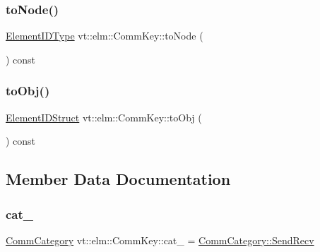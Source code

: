 \subsubsection{\texorpdfstring{to\+Node()}{toNode()}}
{\footnotesize\ttfamily \hyperlink{namespacevt_1_1elm_a63afb64985b41b7b6dcf2f01336391f8}{Element\+I\+D\+Type} vt\+::elm\+::\+Comm\+Key\+::to\+Node (\begin{DoxyParamCaption}{ }\end{DoxyParamCaption}) const\hspace{0.3cm}{\ttfamily [inline]}}

\mbox{\label{structvt_1_1elm_1_1_comm_key_a4dd567c04eea5bb8aeb2acd7ad8f01de}} 
\subsubsection{\texorpdfstring{to\+Obj()}{toObj()}}
{\footnotesize\ttfamily \hyperlink{structvt_1_1elm_1_1_element_i_d_struct}{Element\+I\+D\+Struct} vt\+::elm\+::\+Comm\+Key\+::to\+Obj (\begin{DoxyParamCaption}{ }\end{DoxyParamCaption}) const\hspace{0.3cm}{\ttfamily [inline]}}



\subsection{Member Data Documentation}
\mbox{\label{structvt_1_1elm_1_1_comm_key_a96646f0648cd255cf4cdc37bcc3597ac}} 
\subsubsection{\texorpdfstring{cat\+\_\+}{cat\_}}
{\footnotesize\ttfamily \hyperlink{namespacevt_1_1elm_ab7367fdbe88bdcf329563642147f9ae2}{Comm\+Category} vt\+::elm\+::\+Comm\+Key\+::cat\+\_\+ = \hyperlink{namespacevt_1_1elm_ab7367fdbe88bdcf329563642147f9ae2a95aeb71ffd419cc14c6929f9dcd6cdff}{Comm\+Category\+::\+Send\+Recv}}

